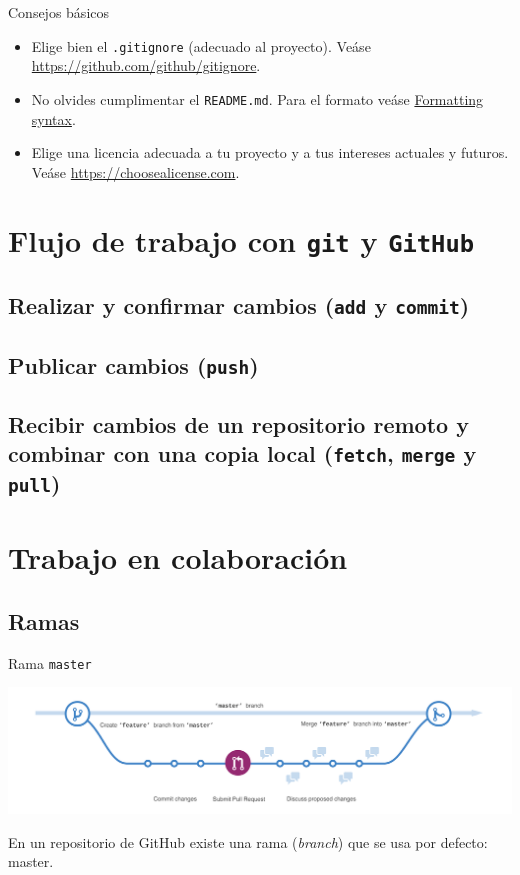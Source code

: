 \documentclass[xcolor={usenames,svgnames,dvipsnames}]{beamer}
\begin{document}
\begin{frame}[label={sec:orgbc5f7cb},fragile]{Consejos básicos}
 \begin{itemize}
\item Elige bien el \texttt{.gitignore} (adecuado al proyecto). Veáse \url{https://github.com/github/gitignore}.
\item No olvides cumplimentar el \texttt{README.md}. Para el formato veáse \href{https://help.github.com/articles/basic-writing-and-formatting-syntax/}{Formatting syntax}.
\item Elige una licencia adecuada a tu proyecto y a tus intereses actuales y futuros. Veáse \url{https://choosealicense.com}.
\end{itemize}
\end{frame}

\section{Flujo de trabajo con \texttt{git} y \texttt{GitHub}}
\label{sec:org5d257ec}
\subsection{Realizar y confirmar cambios (\texttt{add} y \texttt{commit})}
\label{sec:orgc910cad}
\subsection{Publicar cambios (\texttt{push})}
\label{sec:org438d4c9}
\subsection{Recibir cambios de un repositorio remoto y combinar con una copia local (\texttt{fetch}, \texttt{merge} y \texttt{pull})}
\label{sec:orgaf1a0a2}
\section{Trabajo en colaboración}
\label{sec:org7610f70}

\subsection{Ramas}
\label{sec:org3bd1a2c}

\begin{frame}[label={sec:org85fbe83},fragile]{Rama \texttt{master}}
 \begin{center}
\includegraphics[width=.9\linewidth]{figs/branching.png}
\end{center}

En un repositorio de GitHub existe una rama (\emph{branch}) que se usa por defecto: \alert{master}.
\end{frame}
\end{document}
